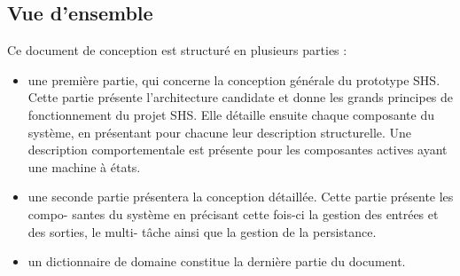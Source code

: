 \newpage
\subsection{Vue d'ensemble} %

Ce document de conception est structuré en plusieurs parties :
\begin{itemize}
    \item une première partie, qui concerne la conception générale du prototype \gls{SHS}. Cette partie présente l'architecture candidate et donne les grands principes de fonctionnement
    du projet \gls{SHS}. Elle détaille ensuite chaque composante du système, en présentant
    pour chacune leur description structurelle. Une description comportementale est présente
    pour les composantes actives ayant une machine à états.
    \item une seconde partie présentera la conception détaillée. Cette partie présente les compo-
    santes du système en précisant cette fois-ci la gestion des entrées et des sorties, le multi-
    tâche ainsi que la gestion de la persistance.
    \item un dictionnaire de domaine constitue la dernière partie du document.
\end{itemize}